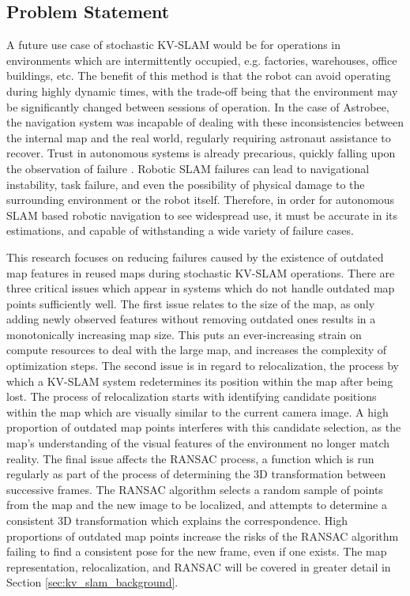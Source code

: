 \subsection{Problem Statement}

A future use case of stochastic KV-SLAM would be for operations in environments which are intermittently occupied, e.g. factories, warehouses, office buildings, etc. The benefit of this method is that the robot can avoid operating during highly dynamic times, with the trade-off being that the environment may be significantly changed between sessions of operation. In the case of Astrobee, the navigation system was incapable of dealing with these inconsistencies between the internal map and the real world, regularly requiring astronaut assistance to recover. Trust in autonomous systems is already precarious, quickly falling upon the observation of failure \cite{robinetteEffectRobotPerformance2017}. Robotic SLAM failures can lead to navigational instability, task failure, and even the possibility of physical damage to the surrounding environment or the robot itself\cite{nahavandiComprehensiveReviewAutonomous2025a}. Therefore, in order for autonomous SLAM based robotic navigation to see widespread use, it must be accurate in its estimations, and capable of withstanding a wide variety of failure cases.

This research focuses on reducing failures caused by the existence of outdated map features in reused maps during stochastic KV-SLAM operations. There are three critical issues which appear in systems which do not handle outdated map points sufficiently well. The first issue relates to the size of the map, as only adding newly observed features without removing outdated ones results in a monotonically increasing map size. This puts an ever-increasing strain on compute resources to deal with the large map, and increases the complexity of optimization steps. The second issue is in regard to relocalization, the process by which a KV-SLAM system redetermines its position within the map after being lost. The process of relocalization starts with identifying candidate positions within the map which are visually similar to the current camera image. A high proportion of outdated map points interferes with this candidate selection, as the map's understanding of the visual features of the environment no longer match reality. The final issue affects the RANSAC process, a function which is run regularly as part of the process of determining the 3D transformation between successive frames. The RANSAC algorithm selects a random sample of points from the map and the new image to be localized, and attempts to determine a consistent 3D transformation which explains the correspondence. High proportions of outdated map points increase the risks of the RANSAC algorithm failing to find a consistent pose for the new frame, even if one exists. The map representation, relocalization, and RANSAC will be covered in greater detail in Section \ref{sec:kv_slam_background}.

